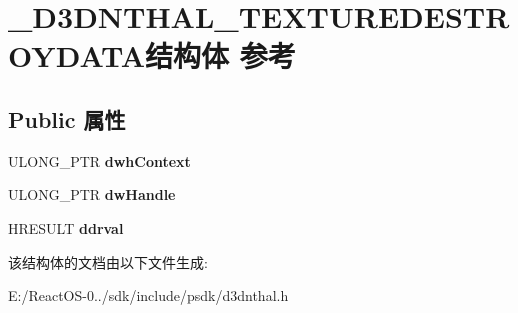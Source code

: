 \hypertarget{struct___d3_d_n_t_h_a_l___t_e_x_t_u_r_e_d_e_s_t_r_o_y_d_a_t_a}{}\section{\+\_\+\+D3\+D\+N\+T\+H\+A\+L\+\_\+\+T\+E\+X\+T\+U\+R\+E\+D\+E\+S\+T\+R\+O\+Y\+D\+A\+T\+A结构体 参考}
\label{struct___d3_d_n_t_h_a_l___t_e_x_t_u_r_e_d_e_s_t_r_o_y_d_a_t_a}
\subsection*{Public 属性}
\begin{DoxyCompactItemize}
\item 
\mbox{\label{struct___d3_d_n_t_h_a_l___t_e_x_t_u_r_e_d_e_s_t_r_o_y_d_a_t_a_a4f7ee215affd0b983537f91b7088b205}} 
U\+L\+O\+N\+G\+\_\+\+P\+TR {\bfseries dwh\+Context}
\item 
\mbox{\label{struct___d3_d_n_t_h_a_l___t_e_x_t_u_r_e_d_e_s_t_r_o_y_d_a_t_a_adfbc64db39f44ae267e6b8177735f85c}} 
U\+L\+O\+N\+G\+\_\+\+P\+TR {\bfseries dw\+Handle}
\item 
\mbox{\label{struct___d3_d_n_t_h_a_l___t_e_x_t_u_r_e_d_e_s_t_r_o_y_d_a_t_a_ac3bc42ef747f0e46a8a5076950457050}} 
H\+R\+E\+S\+U\+LT {\bfseries ddrval}
\end{DoxyCompactItemize}


该结构体的文档由以下文件生成\+:\begin{DoxyCompactItemize}
\item 
E\+:/\+React\+O\+S-\/0../sdk/include/psdk/d3dnthal.\+h\end{DoxyCompactItemize}
